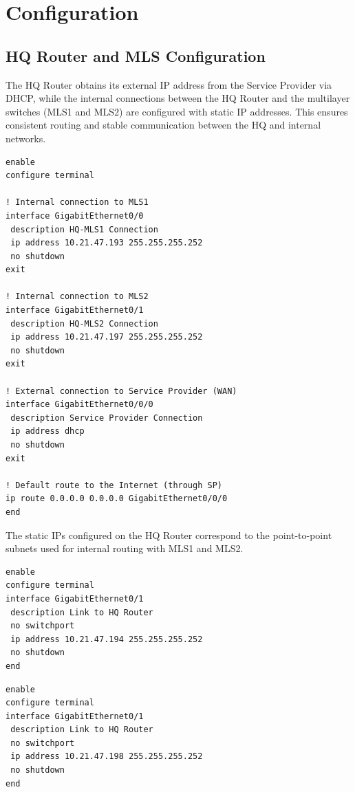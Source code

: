 \section{Configuration}

\subsection{HQ Router and MLS Configuration}
The HQ Router obtains its external \ac{IP} address from the Service Provider via \ac{DHCP}, while the internal connections between the HQ Router and the multilayer switches (MLS1 and MLS2) are configured with static \ac{IP} addresses.  
This ensures consistent routing and stable communication between the HQ and internal networks.

\begin{lstlisting}[caption={HQ Router configuration}, label={lst:hq-router}]
enable
configure terminal

! Internal connection to MLS1
interface GigabitEthernet0/0
 description HQ-MLS1 Connection
 ip address 10.21.47.193 255.255.255.252
 no shutdown
exit

! Internal connection to MLS2
interface GigabitEthernet0/1
 description HQ-MLS2 Connection
 ip address 10.21.47.197 255.255.255.252
 no shutdown
exit

! External connection to Service Provider (WAN)
interface GigabitEthernet0/0/0
 description Service Provider Connection
 ip address dhcp
 no shutdown
exit

! Default route to the Internet (through SP)
ip route 0.0.0.0 0.0.0.0 GigabitEthernet0/0/0
end
\end{lstlisting}

The static \ac{IP}s configured on the HQ Router correspond to the point-to-point subnets used for internal routing with MLS1 and MLS2.

\begin{lstlisting}[caption={MLS1 link to HQ Router}, label={lst:mls1-router-link}]
enable
configure terminal
interface GigabitEthernet0/1
 description Link to HQ Router
 no switchport
 ip address 10.21.47.194 255.255.255.252
 no shutdown
end
\end{lstlisting}

\begin{lstlisting}[caption={MLS2 link to HQ Router}, label={lst:mls2-router-link}]
enable
configure terminal
interface GigabitEthernet0/1
 description Link to HQ Router
 no switchport
 ip address 10.21.47.198 255.255.255.252
 no shutdown
end
\end{lstlisting}


